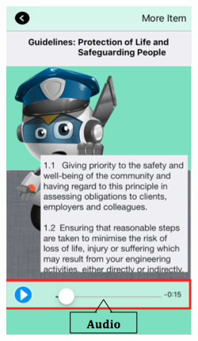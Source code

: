 \newpage 
\begin{figure}[H]\centering
    \begin{subfigure}{0.25\textwidth}
\includegraphics[width=\textwidth]{audio1}
\caption{}
    \end{subfigure}\hspace{0.03\textwidth}
 \begin{subfigure}{0.25\textwidth}

\end{subfigure}
\end{figure}

